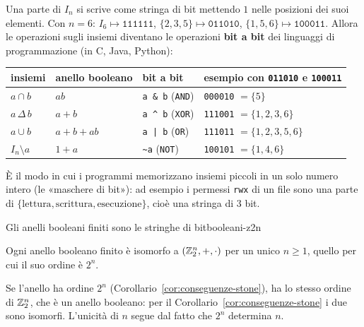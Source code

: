 \begin{spiegazione}
    Una parte di $I_n$ si scrive come stringa di bit mettendo $1$ nelle posizioni dei suoi elementi. Con $n = 6$: $I_6 \mapsto \texttt{111111}$,
    $\{2, 3, 5\} \mapsto \texttt{011010}$, $\{1, 5, 6\} \mapsto \texttt{100011}$. Allora le operazioni sugli insiemi diventano le operazioni \textbf{bit a bit} dei linguaggi
    di programmazione (in C, Java, Python):
    \begin{center}
    \renewcommand{\arraystretch}{1.25}
    \begin{tabular}{l|l|l|l}
        insiemi & anello booleano & bit a bit & esempio con \texttt{011010} e \texttt{100011} \\ \hline
        $a \cap b$ & $ab$ & \texttt{a \& b} (\texttt{AND}) & \texttt{000010} $= \{5\}$ \\
        $a \,\Delta\, b$ & $a + b$ & \texttt{a \textasciicircum{} b} (\texttt{XOR}) & \texttt{111001} $= \{1, 2, 3, 6\}$ \\
        $a \cup b$ & $a + b + ab$ & \texttt{a | b} (\texttt{OR}) & \texttt{111011} $= \{1, 2, 3, 5, 6\}$ \\
        $I_n \setminus a$ & $1 + a$ & \texttt{\textasciitilde a} (\texttt{NOT}) & \texttt{100101} $= \{1, 4, 6\}$ \\
    \end{tabular}
    \end{center}
    È il modo in cui i programmi memorizzano insiemi piccoli in un solo numero intero (le «maschere di bit»): ad esempio i permessi
    \texttt{rwx} di un file sono una parte di $\{\text{lettura}, \text{scrittura}, \text{esecuzione}\}$, cioè una stringa di $3$ bit.
\end{spiegazione}

\begin{concetto}
\begin{Corollario}{Gli anelli booleani finiti sono le stringhe di bit}{booleani-z2n}
    \begin{prerequisiti}
    \end{prerequisiti}
    Ogni anello booleano finito è isomorfo a $(\mathbb{Z}_2^n, +, \cdot)$ per un unico $n \geq 1$, quello per cui il suo ordine è $2^n$.
\end{Corollario}
\begin{dimostrazione}
    Se l'anello ha ordine $2^n$ (Corollario~\ref{cor:conseguenze-stone}), ha lo stesso ordine di $\mathbb{Z}_2^n$, che è un anello booleano: per il Corollario~\ref{cor:conseguenze-stone} i due sono
    isomorfi. L'unicità di $n$ segue dal fatto che $2^n$ determina $n$.
\end{dimostrazione}
\end{concetto}

